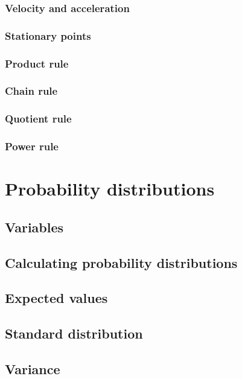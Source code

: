 \documentclass{book}
\begin{document}
\subsection{Velocity and acceleration}


\subsection{Stationary points}


\subsection{Product rule}


\subsection{Chain rule}


\subsection{Quotient rule}


\subsection{Power rule}




\chapter{Probability distributions}
\section{Variables}



\section{Calculating probability distributions}



\section{Expected values}



\section{Standard distribution}



\section{Variance}
\end{document}
